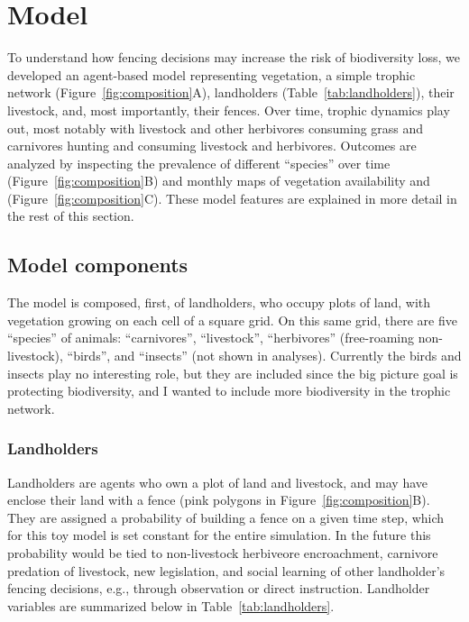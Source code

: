 \documentclass{article}
\begin{document}
\section{Model}
\label{sec:abm}

To understand how fencing decisions may increase the risk of biodiversity
loss, we developed an agent-based model representing vegetation, a simple
trophic network (Figure~\ref{fig:composition}A), landholders
(Table~\ref{tab:landholders}), their livestock, and, most importantly, their
fences. Over time, trophic dynamics play out, most notably with livestock and
other herbivores consuming grass and carnivores hunting and consuming
livestock and herbivores. Outcomes are analyzed by inspecting the prevalence
of different ``species'' over time (Figure~\ref{fig:composition}B) and 
monthly maps of vegetation availability and (Figure~\ref{fig:composition}C). 
These model features are explained in more detail in the rest of this section.


\subsection{Model components}

The model is composed, first, of landholders, who occupy plots of land, with
vegetation growing on each cell of a square grid. On this same grid, there are
five ``species'' of animals: ``carnivores'', ``livestock'', ``herbivores''
(free-roaming non-livestock), ``birds'', and ``insects'' (not shown in
analyses). Currently the birds and insects play no interesting role, but they
are included since the big picture goal is protecting biodiversity, and I
wanted to include more biodiversity in the trophic network.

\subsubsection{Landholders}

Landholders are agents who own a plot of land and livestock, and may have
enclose their land with a fence (pink polygons in
Figure~\ref{fig:composition}B). They are assigned a probability of building a 
fence on a given time step, which for this toy model is set constant for the
entire simulation. In the future this probability would be tied to
non-livestock herbiveore encroachment, carnivore predation of livestock, new
legislation, and social learning of other landholder's fencing decisions, e.g., 
through observation or direct instruction. 
Landholder variables are summarized below in Table~\ref{tab:landholders}.
\end{document}
